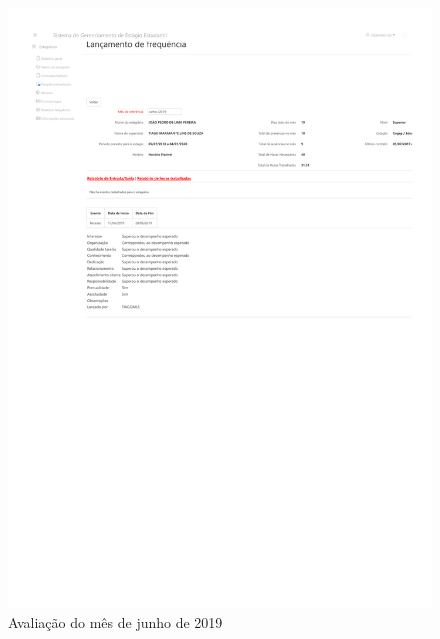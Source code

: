 \begin{anexosenv}
\begin{figure}
    \centering
    \includegraphics[trim=100 410 0 140, clip, width=\textwidth]{anexos/avaliacao201906}
    \caption{Avaliação do mês de junho de 2019}
    \label{fig:avaliacao201906}
\end{figure}

\end{anexosenv}

